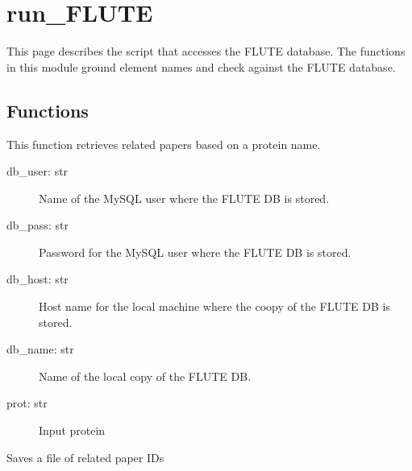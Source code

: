 \documentclass[a4paper,10pt,english]{sphinxmanual}
\begin{document}
\chapter{run\_FLUTE}
\label{\detokenize{run_FLUTE:run-flute}}\label{\detokenize{run_FLUTE::doc}}
\sphinxAtStartPar
This page describes the script that accesses the FLUTE database.
The functions in this module ground element names and check against the FLUTE database.


\section{Functions}
\label{\detokenize{run_FLUTE:functions}}

\begin{fulllineitems}
\label{\detokenize{run_FLUTE:run_FLUTE.getRelatedPapers}}
\sphinxAtStartPar
This function retrieves related papers based on a protein name.
\begin{description}
\item[{db\_user: str}] \leavevmode
\sphinxAtStartPar
Name of the MySQL user where the FLUTE DB is stored.

\item[{db\_pass: str}] \leavevmode
\sphinxAtStartPar
Password for the MySQL user where the FLUTE DB is stored.

\item[{db\_host: str }] \leavevmode
\sphinxAtStartPar
Host name for the local machine where the coopy of the FLUTE DB is stored.

\item[{db\_name: str}] \leavevmode
\sphinxAtStartPar
Name of the local copy of the FLUTE DB.

\item[{prot: str}] \leavevmode
\sphinxAtStartPar
Input protein

\end{description}

\sphinxAtStartPar
Saves a file of related paper IDs

\end{fulllineitems}

\end{document}
